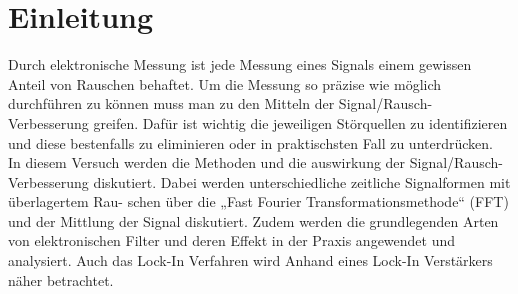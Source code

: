 
\chapter{Einleitung}
\label{chap:einleitung}

Durch elektronische Messung ist jede Messung eines Signals einem gewissen Anteil von Rauschen behaftet. Um die Messung so präzise wie möglich durchführen zu können muss man zu den Mitteln der Signal/Rausch-Verbesserung greifen. Dafür ist wichtig die jeweiligen Störquellen zu identifizieren und diese bestenfalls zu eliminieren oder in praktischsten Fall zu unterdrücken.\\

In diesem Versuch werden die Methoden und die auswirkung der Signal/Rausch-Verbesserung diskutiert. Dabei werden unterschiedliche zeitliche Signalformen mit überlagertem Rau-
schen über die „Fast Fourier Transformationsmethode“ (FFT) und der Mittlung der Signal diskutiert. Zudem werden die grundlegenden Arten von elektronischen Filter und deren Effekt in der Praxis angewendet und analysiert. Auch das Lock-In Verfahren wird Anhand eines Lock-In Verstärkers näher betrachtet.